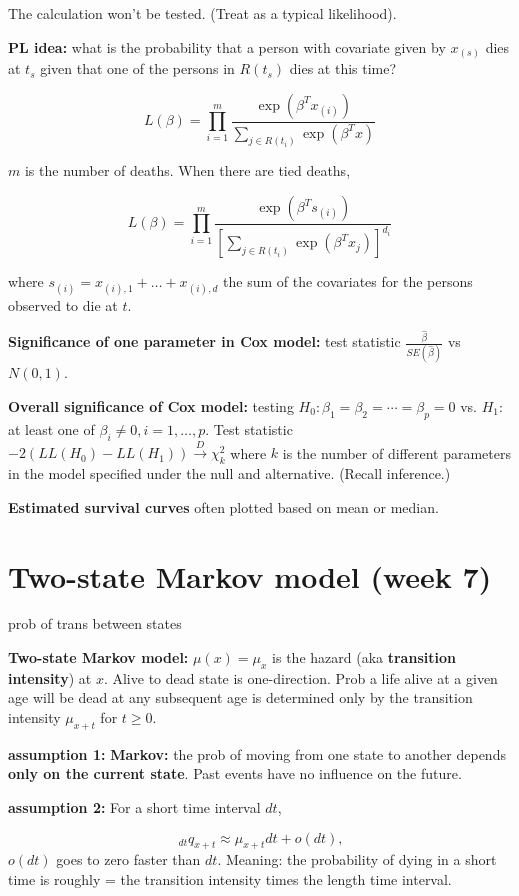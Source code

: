 \documentclass[a4paper]{article}
\begin{document}
The calculation won't be tested. (Treat as a typical likelihood).

\textbf{PL idea:} what is the probability that a person with covariate given by $x_{(s)}$ dies at $t_s$ given that one of the persons in $R(t_s)$ dies at this time?

$$L(\beta)=\prod^m_{i=1}\frac{\exp(\beta^Tx_{(i)})}{\sum_{j\in R(t_i)}\exp(\beta^Tx)}$$

$m$ is the number of deaths. When there are tied deaths,

$$L(\beta)=\prod^m_{i=1}\frac{\exp(\beta^Ts_{(i)})}{[\sum_{j\in R(t_i)}\exp(\beta^Tx_j)]^{d_i}}$$

where $s_{(i)}=x_{(i),1}+\dots+x_{(i),d}$ the sum of the covariates for the persons observed to die at $t$.

\textbf{Significance of one parameter in Cox model:} test statistic $\frac{\hat{\beta}}{SE(\hat{\beta})}$ vs $N(0,1)$.

\textbf{Overall significance of Cox model:} testing $H_0:\beta_1=\beta_2=\cdots=\beta_p=0$ vs. $H_1:$ at least one of $\beta_i\not=0, i=1,\dots, p$. Test statistic $-2(LL(H_0)-LL(H_1))\overset{D}\rightarrow \chi^2_{k}$ where $k$ is the number of different parameters in the model specified under the null and alternative. (Recall inference.)

\textbf{Estimated survival curves} often plotted based on mean or median.

\section{Two-state Markov model (week 7)}

prob of trans between states

\textbf{Two-state Markov model:} $\mu(x)=\mu_x$ is the hazard (aka \textbf{transition intensity}) at $x$. Alive to dead state is one-direction. Prob a life alive at a given age will be dead at any subsequent age is determined only by the transition intensity $\mu_{x+t}$ for $t\geq 0$.

\textbf{assumption 1:} \textbf{Markov:} the prob of moving from one state to another depends \textbf{only on the current state}. Past events have no influence on the future.

\textbf{assumption 2:} For a short time interval $dt$,

$$\ _{dt}q_{x+t}\approx \mu_{x+t}dt+o(dt),$$ $o(dt)$ goes to zero faster than $dt$. Meaning: the probability of dying in a short time is roughly = the transition intensity times the length time interval.
\end{document}
